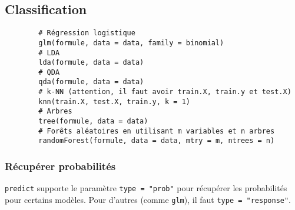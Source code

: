 \subsection{Classification}
    \begin{lstlisting}
        # Régression logistique
        glm(formule, data = data, family = binomial)
        # LDA
        lda(formule, data = data)
        # QDA
        qda(formule, data = data)
        # k-NN (attention, il faut avoir train.X, train.y et test.X)
        knn(train.X, test.X, train.y, k = 1)
        # Arbres
        tree(formule, data = data)
        # Forêts aléatoires en utilisant m variables et n arbres
        randomForest(formule, data = data, mtry = m, ntrees = n)
    \end{lstlisting}

    \subsubsection{Récupérer probabilités}
        \lstinline{predict} supporte le paramètre \lstinline{type = "prob"} pour récupérer les probabilités pour certains modèles. Pour d'autres (comme \lstinline{glm}), il faut \lstinline{type = "response"}.